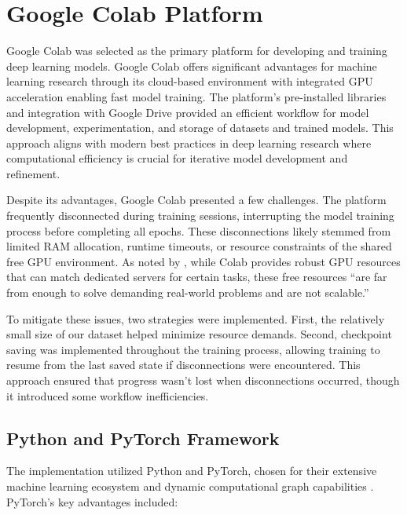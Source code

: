 \documentclass[a4paper,12pt]{report}
\begin{document}
\section{Google Colab Platform}

Google Colab was selected as the primary platform for developing and training deep learning models. Google Colab offers significant advantages for machine learning research through its cloud-based environment with integrated GPU acceleration enabling fast model training. The platform's pre-installed libraries and integration with Google Drive provided an efficient workflow for model development, experimentation, and storage of datasets and trained models. This approach aligns with modern best practices in deep learning research where computational efficiency is crucial for iterative model development and refinement.

Despite its advantages, Google Colab presented a few challenges. The platform frequently disconnected during training sessions, interrupting the model training process before completing all epochs. These disconnections likely stemmed from limited RAM allocation, runtime timeouts, or resource constraints of the shared free GPU environment. As noted by \citep{carneiro2018}, while Colab provides robust GPU resources that can match dedicated servers for certain tasks, these free resources ``are far from enough to solve demanding real-world problems and are not scalable.''

To mitigate these issues, two strategies were implemented. First, the relatively small size of our dataset helped minimize resource demands. Second, checkpoint saving was implemented throughout the training process, allowing training to resume from the last saved state if disconnections were encountered. This approach ensured that progress wasn't lost when disconnections occurred, though it introduced some workflow inefficiencies.


\subsection{Python and PyTorch Framework}

The implementation utilized Python and PyTorch, chosen for their extensive machine learning ecosystem and dynamic computational graph capabilities \citep{geron2019}. PyTorch's key advantages included:
\end{document}
